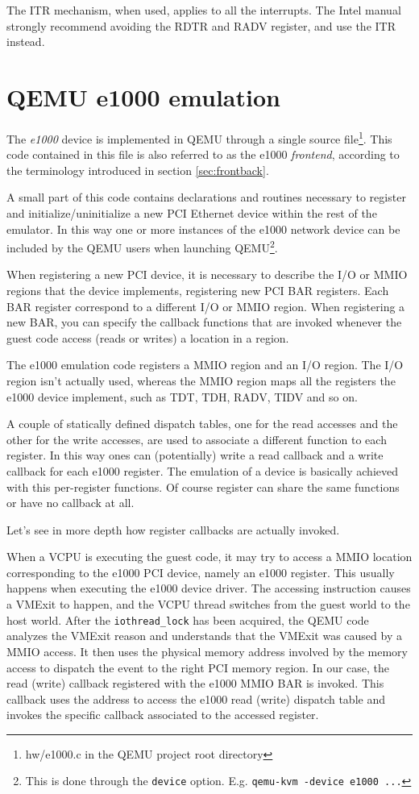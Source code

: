 The ITR mechanism, when used, applies to all the interrupts. The Intel manual strongly recommend avoiding the RDTR and RADV register,
and use the ITR instead.



\section{QEMU e1000 emulation}
The \emph{e1000} device is implemented in QEMU through a single source file\footnote{hw/e1000.c in the QEMU project root directory}.
This code contained in this file is also referred to as the e1000 \emph{frontend}, according to the terminology introduced in section
\ref{sec:frontback}.

A small part of this code contains declarations and routines necessary to register and initialize/uninitialize a new PCI Ethernet 
device within the rest of the emulator. In this way one or more instances of the e1000 network device can be included by the QEMU users
when launching QEMU\footnote{This is done through the \texttt{device} option. E.g. \texttt{qemu-kvm -device e1000 ...} }.

When registering a new PCI device, it is necessary to describe the I/O or MMIO regions that the device implements, registering new
PCI BAR registers. Each BAR register correspond to a different I/O or MMIO region.
When registering a new BAR, you can specify the callback functions that are invoked whenever the guest code access (reads or writes)
a location in a region.

The e1000 emulation code registers a MMIO region and an I/O region. The I/O region isn't actually used, whereas
the MMIO region maps all the registers the e1000 device implement, such as TDT, TDH, RADV, TIDV and so on.

A couple of statically defined dispatch tables, one for the read accesses and the other for the write accesses, are used to associate a
different function to each register.
In this way ones can (potentially) write a read callback and a write callback for each e1000 register.
The emulation of a device is basically achieved with this per-register functions. Of course register can share the same functions or have
no callback at all.

\vspace{0.5cm}
Let's see in more depth how register callbacks are actually invoked.

When a VCPU is executing the guest code, it may try to access a MMIO location corresponding to the e1000 PCI device, namely an e1000
register. This usually happens when executing the e1000 device driver.
The accessing instruction causes a VMExit to happen, and the VCPU thread switches from the guest world to the host world. 
After the \texttt{iothread\_lock} has been acquired, the QEMU code analyzes the VMExit reason and understands that the VMExit was caused
by a MMIO access.
It then uses the physical memory address involved by the memory access to dispatch the event to the right PCI memory region.
In our case, the read (write) callback registered with the e1000 MMIO BAR is invoked. This callback uses the address to access the 
e1000 read (write) dispatch table and invokes the specific callback associated to the accessed register.

